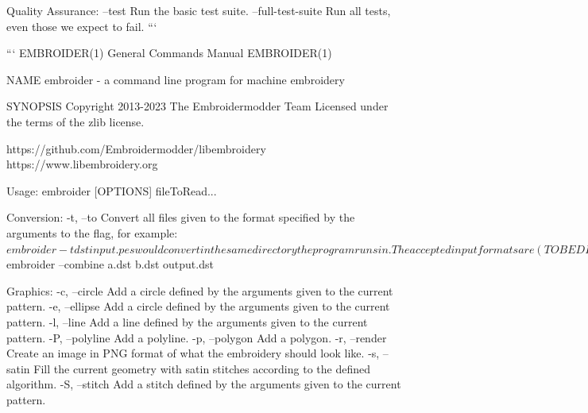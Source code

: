 Quality Assurance:
        --test       Run the basic test suite.
        --full-test-suite  Run all tests, even those we expect to fail.
```

```
EMBROIDER(1)                 General Commands Manual                EMBROIDER(1)

NAME
       embroider - a command line program for machine embroidery

SYNOPSIS
       Copyright 2013-2023 The Embroidermodder Team Licensed under the terms of
       the zlib license.

       https://github.com/Embroidermodder/libembroidery
       https://www.libembroidery.org

       Usage: embroider [OPTIONS] fileToRead...

       Conversion:
           -t, --to        Convert all files given to the format specified
                           by the arguments to the flag, for example:
                               $ embroider -t dst input.pes
                           would convert
                           in the same directory the program runs in.

                           The accepted input formats are (TO BE DETERMINED).
                           The accepted output formats are (TO BE DETERMINED).

       Output:
           -h, --help       Print this message.
           -F, --formats     Print help on the formats that embroider can deal
       with.
           -q, --quiet      Only print fatal errors.
           -V, --verbose    Print everything that has reporting.
           -v, --version    Print the version.

       Modify patterns:
           --combine        takes 3 arguments and combines the first
                            two by placing them atop each other and
                            outputs to the third
                               $ embroider --combine a.dst b.dst output.dst

       Graphics:
           -c, --circle     Add a circle defined by the arguments given to the
       current pattern.
           -e, --ellipse    Add a circle defined by the arguments given to the
       current pattern.
           -l, --line       Add a line defined by the arguments given to the
       current pattern.
           -P, --polyline   Add a polyline.
           -p, --polygon    Add a polygon.
           -r, --render     Create an image in PNG format of what the embroidery
       should look like.
           -s, --satin      Fill the current geometry with satin stitches
       according
                            to the defined algorithm.
           -S, --stitch     Add a stitch defined by the arguments given to the
       current pattern.

